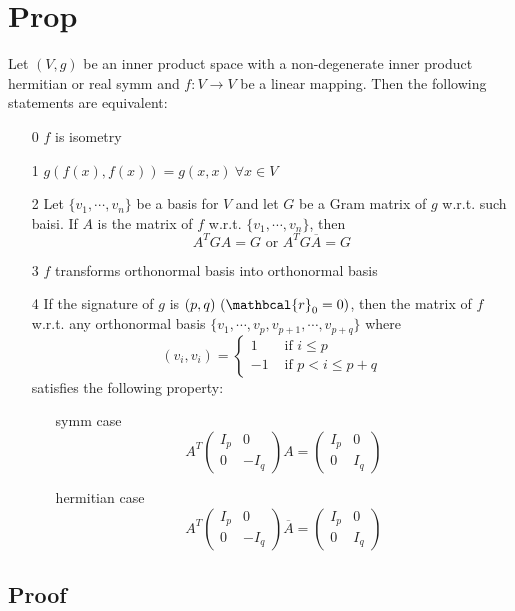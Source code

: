 \documentclass{book}
\begin{document}
\section{Prop}
Let $(V,g)$ be an inner product space with a non-degenerate inner product hermitian or real symm and $f:V\rightarrow V$ be a linear mapping. Then the following statements are equivalent:
\begin{itemize}
    \item [0] $f$ is isometry
    \item [1] $g(f(x),f(x))=g(x,x)\ \forall x\in V$
    \item [2] Let $\{v_1,\cdots,v_n\}$ be a basis for $V$ and let $G$ be a Gram matrix of $g$ w.r.t. such baisi. If $A$ is the matrix of $f$ w.r.t. $\{v_1,\cdots,v_n\}$, then $$A^TGA=G\text{ or } A^TG\overline A=G$$
    \item [3] $f$ transforms orthonormal basis into orthonormal basis
    \item [4] If the signature of $g$ is $(p,q)\ (\mathbcal{r}_0=0)$, then the matrix of $f$ w.r.t. any orthonormal basis $\{v_1,\cdots,v_p,v_{p+1},\cdots,v_{p+q}\}$ where$$(v_i,v_i)=\begin{cases}
    1&\text{ if }i\leq p\\-1&\text{ if }p<i\leq p+q
    \end{cases}$$
    satisfies the following property:\begin{itemize}
        \item [symm case]$$A^T\begin{pmatrix}
            I_p&0\\0&-I_q
        \end{pmatrix}A=\begin{pmatrix}
            I_p&0\\0&I_q\end{pmatrix}$$
        \item [hermitian case]$$A^T\begin{pmatrix}
            I_p&0\\0&-I_q
        \end{pmatrix}\overline A=\begin{pmatrix}
            I_p&0\\0&I_q\end{pmatrix}$$
    \end{itemize}
\end{itemize}
\subsection*{Proof}
\end{document}
